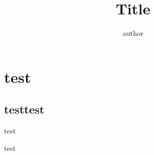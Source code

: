 \documentclass[slidestop,compress,mathserif,10pt,xcolor=dvipsnames]{beamer}
\title{Title}
\author{author}
\date{}
\begin{document}
    \begin{frame}
            \titlepage
    \end{frame}

    \section{test}

    \subsection{testtest}

    \begin{frame}
        test
    \end{frame}

    \begin{frame}
        test
    \end{frame} 
\end{document}
